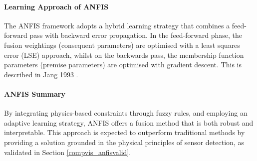     
    \paragraph{Learning Approach of ANFIS}
    
        The ANFIS framework adopts a hybrid learning strategy that combines a feed-forward pass with backward error propagation. In the feed-forward phase, the fusion weightings (consequent parameters) are optimised with a least squares error (LSE) approach, whilst on the backwards pass, the membership function parameters (premise parameters) are optimised with gradient descent. This is described in Jang 1993 \cite{jang1993anfis}.
        
    
    \paragraph{ANFIS Summary} By integrating physics-based constraints through fuzzy rules, and employing an adaptive learning strategy, ANFIS offers a fusion method that is both robust and interpretable. This approach is expected to outperform traditional methods by providing a solution grounded in the physical principles of sensor detection, as validated in Section \ref{compvis_anfisvalid}.
    